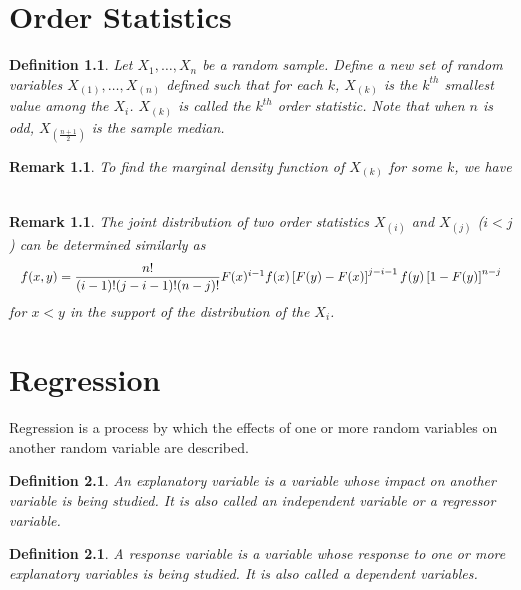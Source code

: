 \documentclass[1pt]{report}
\newtheorem{defn}[thm]{Definition}
\newtheorem{rmk}[thm]{Remark}
\newcommand{\<}{\langle}
\renewcommand{\>}{\rangle}
\begin{document}
\chapter{Order Statistics}
\begin{defn}\label{def:orderstatistic}
Let $X_1, \dots, X_n$ be a random sample. Define a new set of random variables $X_{(1)}, \dots , X_{(n)}$ defined such that for each $k$, $X_{(k)}$ is the $k^{th}$ smallest value among the $X_i$. $X_{(k)}$ is called the $k^{th}$ \emph{order statistic}. Note that when $n$ is odd, $X_{\left(\frac{n+1}{2}\right)}$ is the sample median.
\end{defn}
\begin{rmk}
To find the marginal density function of $X_{(k)}$ for some $k$, we have\\
\\
\end{rmk}
\begin{rmk}
The joint distribution of two order statistics $X_{(i)}$ and $X_{(j)}$ ($i < j$) can be determined similarly as
$$\resizebox{\textwidth}{!}{$f(x, y) = \dfrac{n!}{(i-1)!(j-i-1)!(n-j)!} F(x)^{i-1}f(x)\left[F(y)-F(x)\right]^{j-i-1} f(y) \left[ 1 - F(y)\right]^{n-j}$}$$
for $x < y$ in the support of the distribution of the $X_i$.	
\end{rmk}
\chapter{Regression}
Regression is a process by which the effects of one or more random variables on another random variable are described.
\begin{defn}
An \emph{explanatory variable} is a variable whose impact on another variable is being studied. It is also called an \emph{independent variable} or a \emph{regressor variable}. 
\end{defn}
\begin{defn}
A \emph{response variable} is a variable whose response to one or more explanatory variables is being studied. It is also called a \emph{dependent variables}. 
\end{defn}
\end{document}
